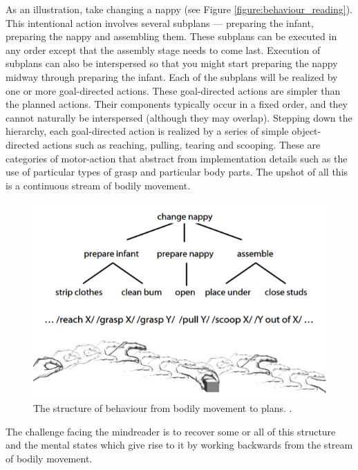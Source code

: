 \documentclass[12pt,\papersize]{extarticle}
\begin{document}
As an illustration, take changing a nappy (see Figure \vref{figure:behaviour_reading}).  
This intentional action involves several subplans --- preparing the infant, preparing the nappy and assembling them.  
These subplans can be executed in any order except that the assembly stage needs to come last.  
Execution of subplans can also be interspersed so that you might start preparing the nappy midway through preparing the infant.  
Each of the subplans will be realized by one or more goal-directed actions.  
These goal-directed actions are simpler than the planned actions.  
Their components typically occur in a fixed order, and they cannot naturally be interspersed (although they may overlap).  
Stepping down the hierarchy, each goal-directed action is realized by a series of simple object-directed actions such as reaching, pulling, tearing and scooping.  
These are categories of motor-action that abstract from implementation details such as the use of particular types of grasp and particular body parts.  
The upshot of all this is a continuous stream of bodily movement.

\begin{figure}
\begin{center}
\includegraphics{figure_behaviour_reading.png}
\caption{
\label{figure:behaviour_reading}
	The structure of behaviour from bodily movement to plans. \citep[The lower image is adapted from][]{en_1462}.
}
\end{center}
\end{figure}

The challenge facing the mindreader is to recover some or all of this structure and the mental states which give rise to it by working backwards from the stream of bodily movement.  
\end{document}
